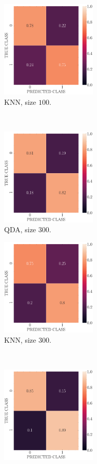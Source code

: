 \documentclass[12pt, a4 paper]{article}
\begin{document}
\begin{figure}[!htbp]
\begin{subfigure}[!htbp]{0.24\textwidth}
       \centering
       \includegraphics[width=1.8in]{../results/ex2/conf_mtx_KNN_dataset_P2b_size_100.pdf}
       \caption{KNN, size $100$.}
       \label{fig:KNN_rr20_P2b_100}
    \end{subfigure}
\\
    \begin{subfigure}[!htbp]{0.24\textwidth}
       \centering
       \includegraphics[width=1.8in]{../results/ex2/conf_mtx_QD_ML_dataset_P2b_size_300.pdf}
       \caption{QDA, size $300$.}
       \label{fig:QDA_rr20_P2b_300}
    \end{subfigure}
\quad \quad
    \begin{subfigure}[!htbp]{0.24\textwidth}
       \centering
       \includegraphics[width=1.8in]{../results/ex2/conf_mtx_KNN_dataset_P2b_size_300.pdf}
       \caption{KNN, size $300$.}
       \label{fig:KNN_rr20_P2b_300}
    \end{subfigure}
\\
    \begin{subfigure}[!htbp]{0.24\textwidth}
       \centering
       \includegraphics[width=1.8in]{../results/ex2/conf_mtx_QD_ML_dataset_P2b_size_999.pdf}

\end{subfigure}
\end{figure}
\end{document}
